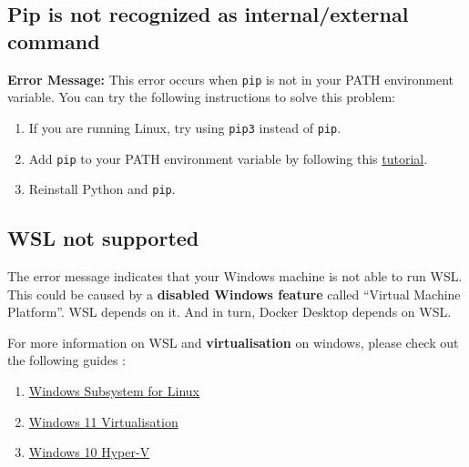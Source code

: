 \subsection{Pip is not recognized as internal/external command}
\textbf{Error Message:} This error occurs when \texttt{pip} is not in your PATH environment variable. You can try the following instructions to solve this problem:
\begin{enumerate}
    \item If you are running Linux, try using \texttt{pip3} instead of \texttt{pip}.
    \item Add \texttt{pip} to your PATH environment variable by following this \href{https://www.geeksforgeeks.org/how-to-install-  pip-on-windows/}{tutorial}.
    \item Reinstall Python and \texttt{pip}.
\end{enumerate}
\subsection{WSL not supported}
The error message indicates that your Windows machine is not able to run WSL. This could be caused by a \textbf{disabled Windows feature} called “Virtual Machine Platform”. WSL depends on it. And in turn, Docker Desktop depends on WSL.

For more information on WSL and \textbf{virtualisation} on windows, please check out the following guides : 

\begin{enumerate}
    \item \href{https://learn.microsoft.com/en-us/windows/wsl/troubleshooting}{Windows Subsystem for Linux}
    \item \href{https://support.microsoft.com/en-us/windows/enable-virtualization-on-windows-11-pcs-c5578302-6e43-4b4b-a449-8ced115f58e1}{Windows 11 Virtualisation}
    \item \href{https://learn.microsoft.com/en-us/virtualization/hyper-v-on-windows/quick-start/enable-hyper-v}{Windows 10 Hyper-V}
\end{enumerate}
